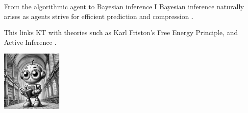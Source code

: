 \begin{frame}[label=bayesian]{From the algorithmic agent to Bayesian inference I}
Bayesian inference naturally arises as agents strive for efficient prediction and compression \cite{ruffiniNavigatingComplexityHow2024}.

This  links KT  with theories such as Karl Friston's Free Energy Principle, and Active Inference \cite{parr2022active}. \ \\ 



\begin{center}%
  \includegraphics[height=3cm]{img/robot_library.png}
  \end{center}
  



\end{frame}




